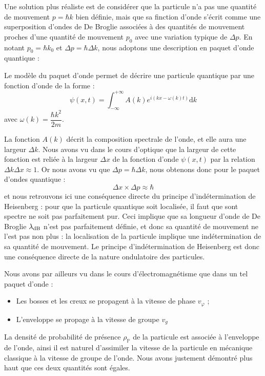 \documentclass[11pt,fleqn]{book} %
\newcommand{\dd}{\mathrm{d}}
\begin{document}
Une solution plus réaliste est de considérer que la particule n'a pas une quantité de mouvement $p = \hbar k$ bien définie, mais que sa finction d'onde s'écrit comme une superposition d'ondes de De Broglie associées à des quantités de mouvement proches d'une quantité de mouvement $p_0$ avec une variation typique de $\Delta p$. En notant $p_0 = \hbar k_0$ et $\Delta p = \hbar \Delta k$, nous adoptons une description en paquet d'onde quantique :
\begin{definition}
	Le modèle du paquet d'onde permet de décrire une particule quantique par une fonction d'onde de la forme :
	\begin{equation}
		\psi(x,t) = \int_{-\infty}^{+\infty} A(k) e^{i(kx - \omega(k)t)} \dd k
	\end{equation}
	avec $\omega(k) = \dfrac{\hbar k^2}{2m}$.
\end{definition}
La fonction $A(k)$ décrit la composition spectrale de l'onde, et elle aura une largeur $\Delta k$. Nous avons vu dans le cours d'optique que la largeur de cette fonction est reliée à la largeur $\Delta x$ de la fonction d'onde $\psi(x,t)$ par la relation $\Delta k \Delta x \approx 1$. Or nous avons vu que $\Delta p = \hbar \Delta k$, nous obtenons donc pour le paquet d'ondes quantique :
\begin{equation}
	\Delta x \times \Delta p \approx \hbar
\end{equation}
et nous retrouvons ici une conséquence directe du principe d'indétermination de Heisenberg : pour que la particule quantique soit localisée, il faut que sont spectre ne soit pas parfaitement pur. Ceci implique que sa longueur d'onde de De Broglie $\lambda_{\rm dB}$ n'est pas parfaitement définie, et donc sa quantité de mouvement ne l'est pas non plus : la localisation de la particule implique une indétermination de sa quantité de mouvement. Le principe d'indétermination de Heisenberg est donc une conséquence directe de la nature ondulatoire des particules.

Nous avons par ailleurs vu dans le cours d'électromagnétisme que dans un tel paquet d'onde :
\begin{itemize}
	\item Les bosses et les creux se propagent à la vitesse de phase $v_\varphi$ ;
	\item L'enveloppe se propage à la vitesse de groupe $v_g$
\end{itemize}
La densité de probabilité de présence $\rho_{\mathbb{P}}$ de la particule est associée à l'enveloppe de l'onde, ainsi il est naturel d'assimiler la vitesse de la particule en mécanique classique à la vitesse de groupe de l'onde. Nous avons justement démontré plus haut que ces deux quantités sont égales.
\end{document}
